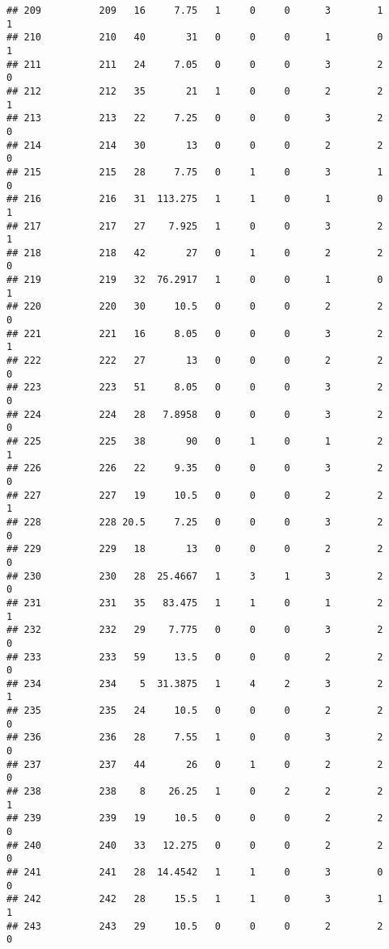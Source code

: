 \documentclass[
]{article}
\begin{document}
\begin{verbatim}
## 209          209   16     7.75   1     0     0      3        1         1
## 210          210   40       31   0     0     0      1        0         1
## 211          211   24     7.05   0     0     0      3        2         0
## 212          212   35       21   1     0     0      2        2         1
## 213          213   22     7.25   0     0     0      3        2         0
## 214          214   30       13   0     0     0      2        2         0
## 215          215   28     7.75   0     1     0      3        1         0
## 216          216   31  113.275   1     1     0      1        0         1
## 217          217   27    7.925   1     0     0      3        2         1
## 218          218   42       27   0     1     0      2        2         0
## 219          219   32  76.2917   1     0     0      1        0         1
## 220          220   30     10.5   0     0     0      2        2         0
## 221          221   16     8.05   0     0     0      3        2         1
## 222          222   27       13   0     0     0      2        2         0
## 223          223   51     8.05   0     0     0      3        2         0
## 224          224   28   7.8958   0     0     0      3        2         0
## 225          225   38       90   0     1     0      1        2         1
## 226          226   22     9.35   0     0     0      3        2         0
## 227          227   19     10.5   0     0     0      2        2         1
## 228          228 20.5     7.25   0     0     0      3        2         0
## 229          229   18       13   0     0     0      2        2         0
## 230          230   28  25.4667   1     3     1      3        2         0
## 231          231   35   83.475   1     1     0      1        2         1
## 232          232   29    7.775   0     0     0      3        2         0
## 233          233   59     13.5   0     0     0      2        2         0
## 234          234    5  31.3875   1     4     2      3        2         1
## 235          235   24     10.5   0     0     0      2        2         0
## 236          236   28     7.55   1     0     0      3        2         0
## 237          237   44       26   0     1     0      2        2         0
## 238          238    8    26.25   1     0     2      2        2         1
## 239          239   19     10.5   0     0     0      2        2         0
## 240          240   33   12.275   0     0     0      2        2         0
## 241          241   28  14.4542   1     1     0      3        0         0
## 242          242   28     15.5   1     1     0      3        1         1
## 243          243   29     10.5   0     0     0      2        2         0

\end{verbatim}
\end{document}
